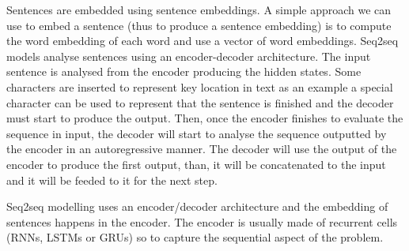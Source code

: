 \begin{box-stud}
    Sentences are embedded using sentence embeddings. A simple approach we can use to embed a sentence (thus to produce a sentence embedding) is to compute the word embedding of each word and use a vector of word embeddings. Seq2seq models analyse sentences using an encoder-decoder architecture. The input sentence is analysed from the encoder producing the hidden states. Some characters are inserted to represent key location in text as an example a special character can be used to represent that the sentence is finished and the decoder must start to produce the output. Then, once the encoder finishes to evaluate the sequence in input, the decoder will start to analyse the sequence outputted by the encoder in an autoregressive manner. The decoder will use the output of the encoder to produce the first output, than, it will be concatenated to the input and it will be feeded to it for the next step.
\end{box-stud}

\begin{box-sol}
    Seq2seq modelling uses an encoder/decoder architecture and the embedding of sentences happens in the encoder. The encoder is usually made of recurrent cells (RNNs, LSTMs or GRUs) so to capture the sequential aspect of the problem.
\end{box-sol}



